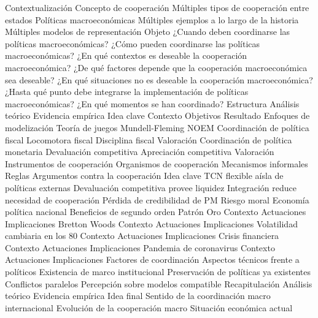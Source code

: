 \documentclass{nuevotema}
\begin{document}
\begin{esquema}[enumerate]
	\1[] 
		\2 Contextualización
			\3 Concepto de cooperación
			\3 Múltiples tipos de cooperación entre estados
			\3 Políticas macroeconómicas
			\3 Múltiples ejemplos a lo largo de la historia
			\3 Múltiples modelos de representación
		\2 Objeto
			\3 ¿Cuando deben coordinarse las políticas macroeconómicas?
			\3 ¿Cómo pueden coordinarse las políticas macroeconómicas?
			\3 ¿En qué contextos es deseable la cooperación macroeconómica?
			\3 ¿De qué factores depende que la cooperación macroeconómica sea deseable?
			\3 ¿En qué situaciones no es deseable la cooperación macroeconómica?
			\3 ¿Hasta qué punto debe integrarse la implementación de políticas macroeconómicas?
			\3 ¿En qué momentos se han coordinado?
		\2 Estructura
			\3 Análisis teórico
			\3 Evidencia empírica
	\1 
		\2 Idea clave
			\3 Contexto
			\3 Objetivos
			\3 Resultado
		\2 Enfoques de modelización
			\3 Teoría de juegos
			\3 Mundell-Fleming
			\3 NOEM
		\2 Coordinación de política fiscal
			\3 Locomotora fiscal
			\3 Disciplina fiscal
			\3 Valoración
		\2 Coordinación de política monetaria
			\3 Devaluación competitiva
			\3 Apreciación competitiva
			\3 Valoración
		\2 Instrumentos de cooperación
			\3 Organismos de cooperación
			\3 Mecanismos informales
			\3 Reglas
		\2 Argumentos contra la cooperación
			\3 Idea clave
			\3 TCN flexible aísla de políticas externas
			\3 Devaluación competitiva provee liquidez
			\3 Integración reduce necesidad de cooperación
			\3 Pérdida de credibilidad de PM
			\3 Riesgo moral
			\3 Economía política nacional
			\3 Beneficios de segundo orden
	\1 
		\2 Patrón Oro
			\3 Contexto
			\3 Actuaciones
			\3 Implicaciones
		\2 Bretton Woods
			\3 Contexto
			\3 Actuaciones
			\3 Implicaciones
		\2 Volatilidad cambiaria en los 80
			\3 Contexto
			\3 Actuaciones
			\3 Implicaciones
		\2 Crisis financiera
			\3 Contexto
			\3 Actuaciones
			\3 Implicaciones
		\2 Pandemia de coronavirus
			\3 Contexto
			\3 Actuaciones
			\3 Implicaciones
		\2 Factores de coordinación
			\3 Aspectos técnicos frente a políticos
			\3 Existencia de marco institucional
			\3 Preservación de políticas ya existentes
			\3 Conflictos paralelos
			\3 Percepción sobre modelos compatible
	\1[] 
		\2 Recapitulación
			\3 Análisis teórico
			\3 Evidencia empírica
		\2 Idea final
			\3 Sentido de la coordinación macro internacional
			\3 Evolución de la cooperación macro
			\3 Situación económica actual

\end{esquema}
\end{document}
